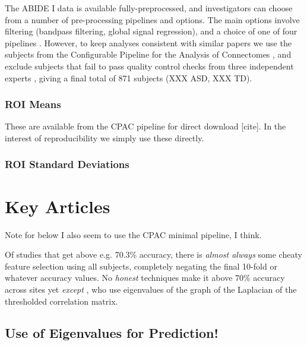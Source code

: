 \documentclass[10pt]{article}
\begin{document}
The ABIDE I data is available fully-preprocessed, and investigators can choose from a number of
pre-processing pipelines and options. The main options involve filtering (bandpass filtering, global
signal regression), and a choice of one of four pipelines \citep{dimartinoAutismBrainImaging2014}.
However, to keep analyses consistent with similar papers
\citet{abrahamDerivingReproducibleBiomarkers2017, mostafaDiagnosisAutismSpectrum2019,
yinDiagnosisAutismSpectrum2021, heinsfeldIdentificationAutismSpectrum2018} we use the subjects from
the Configurable Pipeline for the Analysis of Connectomes
\citep[CPAC;][]{cameronAutomatedAnalysisConnectomes2013}, and exclude subjects that fail to pass quality
control checks from three independent experts \citep[see][for
details]{abrahamDerivingReproducibleBiomarkers2017}, giving a final total of 871 subjects (XXX ASD,
XXX TD).



\subsubsection{ROI Means}

These are available from the CPAC pipeline for direct download [cite]. In the interest of reproducibility we simply
use these directly.

\subsubsection{ROI Standard Deviations}






\newpage

\section{Key Articles} \label{key-articles}

Note for below I also seem to use the CPAC minimal pipeline, I think.

Of studies that get above e.g. 70.3\% accuracy, there is \emph{almost always} some cheaty feature
selection using all subjects, completely negating the final 10-fold or whatever accuracy values. No
\emph{honest} techniques make it above 70\% accuracy across sites yet \emph{except}
\citet{mostafaDiagnosisAutismSpectrum2019,yinDiagnosisAutismSpectrum2021}, who use eigenvalues of
the graph of the Laplacian of the thresholded correlation matrix.

\subsection{Use of Eigenvalues for Prediction! \citet{mostafaDiagnosisAutismSpectrum2019}} \label{eig-pred}
\end{document}
